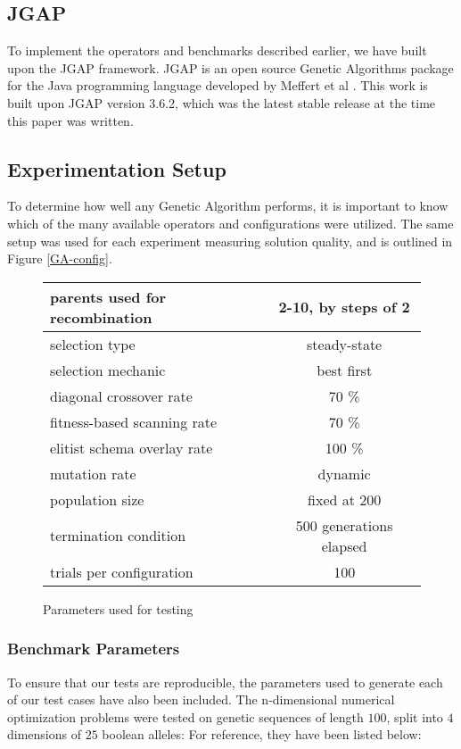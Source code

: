 \subsection*{JGAP}
To implement the operators and benchmarks described earlier, we have built upon the JGAP framework. JGAP is an open source Genetic Algorithms package for the Java programming language developed by Meffert et al \cite{jgap}. This work is built upon JGAP version 3.6.2, which was the latest stable release at the time this paper was written.

\subsection*{Experimentation Setup}

To determine how well any Genetic Algorithm performs, it is important to know which of the many available operators and configurations were utilized. The same setup was used for each experiment measuring solution quality, and is outlined in Figure \ref{GA-config}. 

\begin{figure}[h]
\begin{center}
\begin{tabular}{ | l | c | }
\hline
parents used for recombination & 2-10, by steps of 2 \\
\hline
selection type & steady-state \\
\hline
selection mechanic & best first \\
\hline
diagonal crossover rate & 70 \% \\
\hline
fitness-based scanning rate & 70 \% \\
\hline
elitist schema overlay rate & 100 \% \\
\hline
mutation rate & dynamic \cite{Back93} \\
\hline
population size & fixed at 200 \\
\hline
termination condition & 500 generations elapsed \\
\hline
trials per configuration & 100 \\
\hline
\end{tabular}
\caption{Parameters used for testing}
\label{fig:GA-config}
\end{center}
\end{figure}



\subsubsection*{Benchmark Parameters}
To ensure that our tests are reproducible, the parameters used to generate each of our test cases have also been included. The n-dimensional numerical optimization problems were tested on genetic sequences of length $100$, split into $4$ dimensions of $25$ boolean alleles: For reference, they have been listed below:

